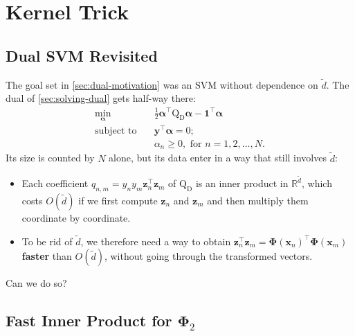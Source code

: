\section{Kernel Trick}\label{sec:kernel-trick}


\subsection{Dual SVM Revisited}

The goal set in \autoref{sec:dual-motivation} was an SVM without dependence
on \(\tilde{d}\). The dual of \autoref{sec:solving-dual} gets half-way
there:
\[
    \begin{aligned}
        \min_{\bm{\alpha}} \quad & \frac{1}{2} \bm{\alpha}^\top
            \mathrm{Q}_{\mathrm{D}} \bm{\alpha} - \bm{1}^\top \bm{\alpha}\\
        \text{subject to} \quad & \bm{y}^\top \bm{\alpha} = 0;\\
        & \alpha_n \ge 0, \text{ for } n = 1, 2, \dots , N.
    \end{aligned}
\]
Its size is counted by \(N\) alone, but its data enter in a way that still
involves \(\tilde{d}\):
\begin{itemize}
    \item Each coefficient \(q_{n,m} = y_n y_m \bm{z}_n^\top \bm{z}_m\) of
        \(\mathrm{Q}_{\mathrm{D}}\) is an inner product in
        \(\mathbb{R}^{\tilde{d}}\), which costs \(O(\tilde{d})\) if we first
        compute \(\bm{z}_n\) and \(\bm{z}_m\) and then multiply them
        coordinate by coordinate.
    \item To be rid of \(\tilde{d}\), we therefore need a way to obtain
        \(\bm{z}_n^\top \bm{z}_m = \bm{\Phi}(\bm{x}_n)^\top
        \bm{\Phi}(\bm{x}_m)\) \textbf{faster} than \(O(\tilde{d})\), without
        going through the transformed vectors.
\end{itemize}

\begin{question}
    Can we do so?
\end{question}

\subsection{Fast Inner Product for \texorpdfstring{\(\bm{\Phi}_2\)}{Phi2}}

